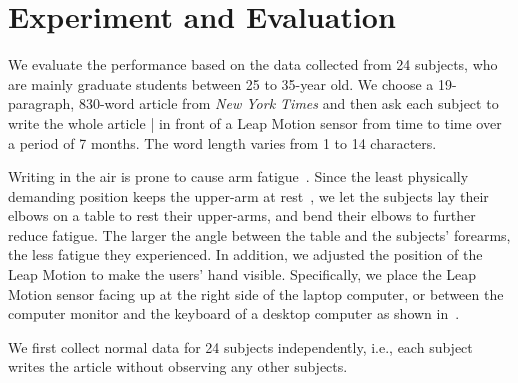 \section{Experiment and Evaluation}
\label{sec:results}

We evaluate the performance based on the data collected from 24 subjects, who are mainly graduate students between 25 to 35-year old. We choose a 19-paragraph, 830-word article from \textit{New York Times} and then ask each subject to write the whole article  | in front of a Leap Motion sensor from time to time over a period of 7 months. The word length varies from 1 to 14 characters. 

Writing in the air is prone to cause arm fatigue~\cite{Consumed_Endurance_fatigue_CHI_2014}. Since
the least physically demanding position keeps the upper-arm
at rest~\cite{Cockburn_AirPointing_2011HCS}, we let the subjects lay their elbows on a table
to rest their upper-arms, and bend their elbows to further
reduce fatigue. The larger the angle between the table and
the subjects' forearms, the less fatigue they experienced. In
addition, we adjusted the position of the Leap Motion to make
the users' hand visible.
Specifically, we place the Leap Motion sensor facing up at the right side of the laptop computer, or between the computer monitor and the keyboard of a desktop computer as shown in~. 

We first collect normal data for 24 subjects independently, i.e., each subject writes the article without observing any other subjects.  



